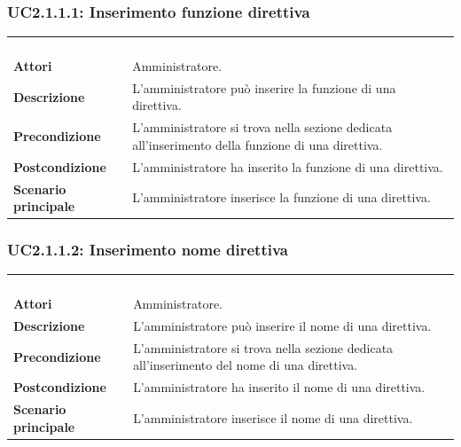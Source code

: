 \subsubsection{UC2.1.1.1: Inserimento funzione direttiva}
\label{UC2.1.1.1}
\begin{longtable}{l|p{10cm}}
\rowcolor[gray]{0.8} \multicolumn{2}{c}{} \\
\rowcolor[gray]{0.8} \multicolumn{2}{c}{\textbf{UC2.1.1.1 - Inserimento funzione direttiva}} \\
\rowcolor[gray]{0.8} \multicolumn{2}{c}{} \\
\hline
&\\
\textbf{Attori} & Amministratore.\\[7pt]
\textbf{Descrizione} & L'amministratore può inserire la funzione di una direttiva.\\[7pt]
\textbf{Precondizione} & L'amministratore si trova nella sezione dedicata all'inserimento della funzione di una direttiva.\\[7pt]
\textbf{Postcondizione} & L'amministratore ha inserito la funzione di una direttiva.\\[7pt]
\textbf{Scenario principale} &L'amministratore inserisce la funzione di una direttiva.\\[7pt]\hline
\end{longtable}

\subsubsection{UC2.1.1.2: Inserimento nome direttiva}
\label{UC2.1.1.2}
\begin{longtable}{l|p{10cm}}
\rowcolor[gray]{0.8} \multicolumn{2}{c}{} \\
\rowcolor[gray]{0.8} \multicolumn{2}{c}{\textbf{UC2.1.1.2 - Inserimento nome direttiva}} \\
\rowcolor[gray]{0.8} \multicolumn{2}{c}{} \\
\hline
&\\
\textbf{Attori} & Amministratore.\\[7pt]
\textbf{Descrizione} & L'amministratore può inserire il nome di una direttiva.\\[7pt]
\textbf{Precondizione} & L'amministratore si trova nella sezione dedicata all'inserimento del nome di una direttiva.\\[7pt]
\textbf{Postcondizione} & L'amministratore ha inserito il nome di una direttiva.\\[7pt]
\textbf{Scenario principale} &L'amministratore inserisce il nome di una direttiva.\\[7pt]\hline
\end{longtable}

